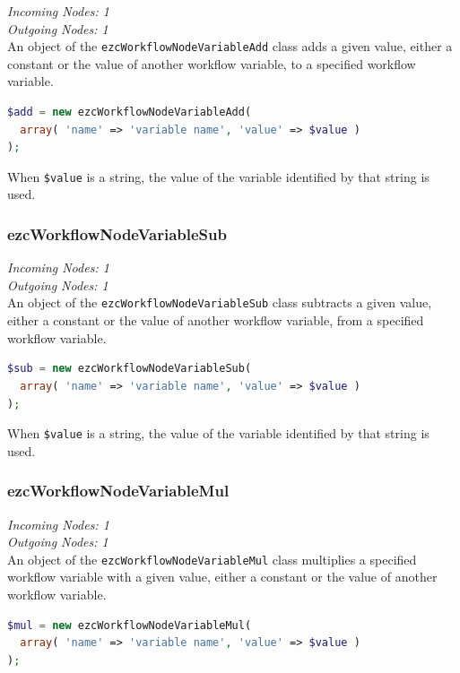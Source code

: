 \emph{Incoming Nodes: 1}\\
\emph{Outgoing Nodes: 1}\\

An object of the \texttt{ezcWorkflowNodeVariableAdd} class adds a given value,
either a constant or the value of another workflow variable, to a specified
workflow variable.

\begin{lstlisting}[language=PHP]
$add = new ezcWorkflowNodeVariableAdd(
  array( 'name' => 'variable name', 'value' => $value )
);
\end{lstlisting}

When \texttt{\$value} is a string, the value of the variable identified by
that string is used.

\subsubsection{ezcWorkflowNodeVariableSub}

\emph{Incoming Nodes: 1}\\
\emph{Outgoing Nodes: 1}\\

An object of the \texttt{ezcWorkflowNodeVariableSub} class subtracts a given
value, either a constant or the value of another workflow variable, from a
specified workflow variable.

\begin{lstlisting}[language=PHP]
$sub = new ezcWorkflowNodeVariableSub(
  array( 'name' => 'variable name', 'value' => $value )
);
\end{lstlisting}

When \texttt{\$value} is a string, the value of the variable identified by
that string is used.

\subsubsection{ezcWorkflowNodeVariableMul}

\emph{Incoming Nodes: 1}\\
\emph{Outgoing Nodes: 1}\\

An object of the \texttt{ezcWorkflowNodeVariableMul} class multiplies a specified
workflow variable with a given value, either a constant or the value of another
workflow variable.

\begin{lstlisting}[language=PHP]
$mul = new ezcWorkflowNodeVariableMul(
  array( 'name' => 'variable name', 'value' => $value )
);
\end{lstlisting}

